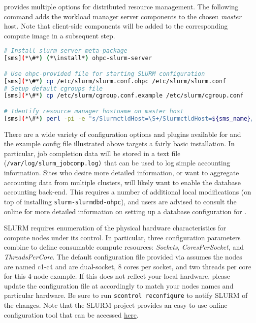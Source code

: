 \OHPC{} provides multiple options for distributed resource management.
The following command adds the \SLURM{} workload manager server components to the
chosen {\em master} host. Note that client-side components will be added to
the corresponding compute image in a subsequent step.

\begin{lstlisting}[language=bash,keywords={}]
# Install slurm server meta-package
[sms](*\#*) (*\install*) ohpc-slurm-server

# Use ohpc-provided file for starting SLURM configuration
[sms](*\#*) cp /etc/slurm/slurm.conf.ohpc /etc/slurm/slurm.conf
# Setup default cgroups file
[sms](*\#*) cp /etc/slurm/cgroup.conf.example /etc/slurm/cgroup.conf

# Identify resource manager hostname on master host
[sms](*\#*) perl -pi -e "s/SlurmctldHost=\S+/SlurmctldHost=${sms_name}/" /etc/slurm/slurm.conf
\end{lstlisting}

There are a wide variety of configuration options and plugins available
for \SLURM{} and the example config file illustrated above targets a fairly
basic installation. In particular, job completion data will be stored in a text
file (\texttt{/var/log/slurm\_jobcomp.log)} that can be used to log simple
accounting information. Sites who desire more detailed information, or want to
aggregate accounting data from multiple clusters, will likely want to enable the
database accounting back-end.  This requires a number of additional local modifications
(on top of installing \texttt{slurm-slurmdbd-ohpc}), and users are advised to
consult the online \href{https://slurm.schedmd.com/accounting.html}{\color{blue}{documentation}}
for more detailed information on setting up a database configuration for \SLURM{}.

\begin{center}
\begin{tcolorbox}[]
  \small SLURM requires enumeration of the physical hardware characteristics for
  compute nodes under its control. In particular, three configuration parameters
  combine to define consumable compute resources: {\em Sockets}, {\em
  CoresPerSocket}, and {\em ThreadsPerCore}. The default configuration file
  provided via \OHPC{} assumes the nodes are named c1-c4 and are dual-socket, 8
  cores per socket, and two threads per core for this 4-node example. If this
  does not reflect your local hardware, please update the configuration file at
   accordingly to match your nodes names and
  particular hardware. Be sure to run \texttt{scontrol reconfigure} to notify
  SLURM of the changes. Note that the SLURM project provides an easy-to-use
  online configuration tool that can be accessed
  \href{https://slurm.schedmd.com/configurator.html}{\color{blue} here}.
\end{tcolorbox}
\end{center}

